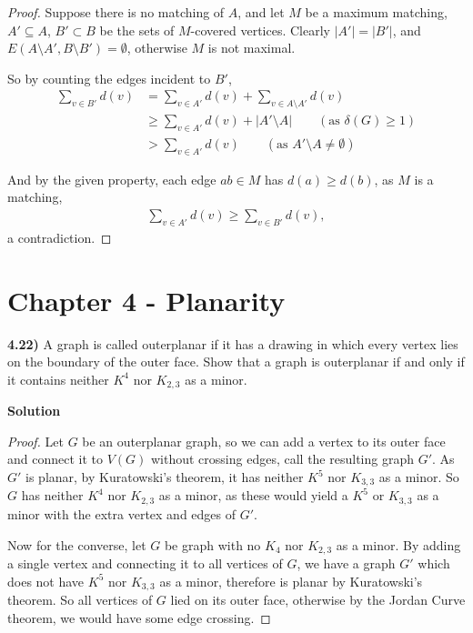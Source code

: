 \documentclass[11pt]{article}
\theoremstyle{plain}
\begin{document}
\begin{proof}
Suppose there is no matching of $A$, and let $M$ be a maximum matching, $A' \subseteq A$, $B' \subset B$ be the sets of $M$-covered vertices. Clearly $|A'| = |B'|$, and $E(A \setminus A',B \setminus B') = \emptyset$, otherwise $M$ is not maximal.

So by counting the edges incident to $B'$,
\begin{align*}
\sum \limits_{v \in B'} d(v) & = \sum \limits_{v \in A'} d(v) + \sum \limits_{v \in A\setminus A'} d(v) \\
& \geq \sum \limits_{v \in A'}d(v)  + |A' \setminus A| \qquad (\text{as } \delta(G) \geq 1)\\
& > \sum \limits_{v \in A'} d(v)  \qquad (\text{as } A' \setminus A \neq \emptyset) 
\end{align*}

And by the given property, each edge $ab \in M$ has $d(a) \geq d(b)$, as $M$ is a matching, 
\begin{align*}
\sum \limits_{v \in A'} d(v) \geq \sum \limits_{v \in B'} d(v) ,
\end{align*}
a contradiction.

\end{proof}



\section{Chapter 4 - Planarity}

\textbf{4.22)} A graph is called outerplanar if it has a drawing in which every vertex lies on the boundary of the outer face. Show that a graph is outerplanar if and only if it contains neither $K^4$ nor $K_{2,3}$ as a minor.

\textbf{Solution}

\begin{proof}
Let $G$ be an outerplanar graph, so we can add a vertex to its outer face and connect it to $V(G)$ without crossing edges, call the resulting graph $G'$. As $G'$ is planar, by Kuratowski's theorem, it has neither $K^5$ nor $K_{3,3}$ as a minor. So $G$ has neither $K^4$ nor $K_{2,3}$ as a minor, as these would yield a $K^5$ or $K_{3,3}$ as a minor with the extra vertex and edges of $G'$.

Now for the converse, let $G$ be graph with no $K_4$ nor $K_{2,3}$ as a minor. By adding a single vertex and connecting it to all vertices of $G$, we have a graph $G'$ which does not have $K^5$ nor $K_{3,3}$ as a minor, therefore is planar by Kuratowski's theorem. So all vertices of $G$ lied on its outer face, otherwise by the Jordan Curve theorem, we would have some edge crossing. 
\end{proof}
\end{document}

